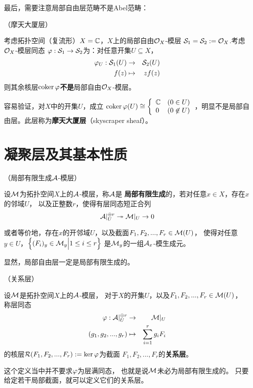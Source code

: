 最后，需要注意局部自由层范畴不是Abel范畴：

\begin{Example}（摩天大厦层）

考虑拓扑空间（复流形）$X=\mathbb{C}$，$X$上的局部自由$\mathcal{O}_X$-模层
$\mathcal{S}_1=\mathcal{S}_2:=\mathcal{O}_X$.考虑$\mathcal{O}_X$-模层同态
$\varphi:\mathcal{S}_1\to\mathcal{S}_2$为：对任意开集$U\subseteq X$，
\begin{eqnarray*}
\varphi_U:\mathcal{S}_1(U)&\to&\mathcal{S}_2(U)\\
f(z)&\mapsto&zf(z)
\end{eqnarray*}
则其余核层$\operatorname{coker}\varphi$\textbf{不是}局部自由$\mathcal{O}_X$-模层。
\end{Example}
容易验证，对$X$中的开集$U$，成立
$
  \coker\fai(U)
\cong
  \left\{
    \begin{array}{ll}
      \bbC  &  (0\in U)\\
      0     &  (0\not\in U)
    \end{array}
  \right.
\index{skyscrapter sheaf\kong 摩天大厦层}
$，明显不是局部自由层。此层称为\textbf{摩天大厦层}（skyscraper sheaf）。

\section{凝聚层及其基本性质}

\begin{definition}（局部有限生成$\mathcal{A}$-模层）

设$\mathcal{M}$为拓扑空间$X$上的$\mathcal{A}$-模层，称$\mathcal{A}$是
\textbf{局部有限生成}的，若对任意$x\in X$，存在$x$的邻域$U$，
以及正整数$r$，使得有层同态短正合列
$$\mathcal{A}|_U^{\oplus r}\twoheadrightarrow\mathcal{M}|_U\to 0$$
\end{definition}

或者等价地，存在$x$的开邻域$U$，以及截面$F_1,F_2,...,F_r\in\mathcal{M}(U)$，
使得对任意$y\in U$，$\Big\{ (F_i)_y\in\mathcal{M}_y \Big| 1\leq i\leq r \Big\}$
是$\mathcal{M}_y$的一组$\mathcal{A}_x$-模生成元。

显然，局部自由层一定是局部有限生成的。

\begin{definition}（关系层）

设$\mathcal{M}$是拓扑空间$X$上的$\mathcal{A}$-模层，
对于$X$的开集$U$，以及$F_1,F_2,...,F_r\in\mathcal{M}(U)$，
称层同态
\begin{eqnarray*}
     \varphi:\mathcal{A}|_U^{\oplus r} &\to&  \mathcal{M}|_{U}\\
     (g_1,g_2,...,g_{r})&\mapsto&\sum_{i=1}^{r}g_iF_i
\end{eqnarray*}
的核层$\mathcal{R}(F_1,F_2,...,F_r):=\ker\varphi$为截面
$F_1,F_2,...,F_r$的\textbf{关系层}。
\end{definition}
这个定义当中并不要求$\varphi$为层满同态，
也就是说$\mathcal{M}$未必为局部有限生成的。
只要给定若干局部截面，就可以定义它们的关系层。

